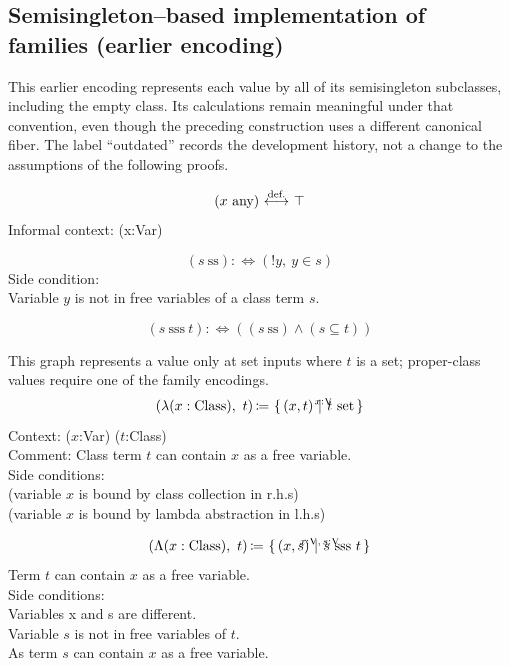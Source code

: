 \subsection{Semisingleton--based implementation of families (earlier encoding)}
This earlier encoding represents each value by all of its semisingleton subclasses, including the empty class. Its calculations remain meaningful under that convention, even though the preceding construction uses a different canonical fiber. The label ``outdated'' records the development history, not a change to the assumptions of the following proofs.
\begin{definition}
\[
(x\ \mbox{any}) \ {\stackrel{{\textrm{def.}}}{\longleftrightarrow}}\  \top
\]
Informal context: (x:Var) %
\end{definition}

\begin{definition}
\[
(s\ \mbox{ss}) :\iff (!y,\ y\in s)
\]
Side condition:\\
Variable $y$ is not in free variables of a class term $s$.
\end{definition}

\begin{definition}
\[
(s\ \mbox{sss}\ t) :\iff ((s\ \mbox{ss})\land(s\subseteq t))
\]
\end{definition}

\begin{definition}
This graph represents a value only at set inputs where $t$ is a set;
proper-class values require one of the family encodings.
\[
(\lambda (x:\Class),\ t) \ceq \ccc{x:\V}{(x,t)}{t\set}
\]
Context: ($x$:Var) ($t$:Class)\\
Comment: Class term $t$ can contain $x$ as a free variable.\\
Side conditions:\\
(variable $x$ is bound by class collection in r.h.s)\\
(variable $x$ is bound by lambda abstraction in l.h.s)
\end{definition}
\begin{definition}
\[
(\Lambda (x:\Class),\ t) \ceq \ccc{x:\V,\,s:\V}{(x,s)}{s\ \mbox{sss}\ t}
\]
Term $t$ can contain $x$ as a free variable.\\
Side conditions:\\
Variables x and s are different.\\ %
Variable $s$ is not in free variables of $t$.\\
As term $s$ can contain $x$ as a free variable.
\end{definition}

